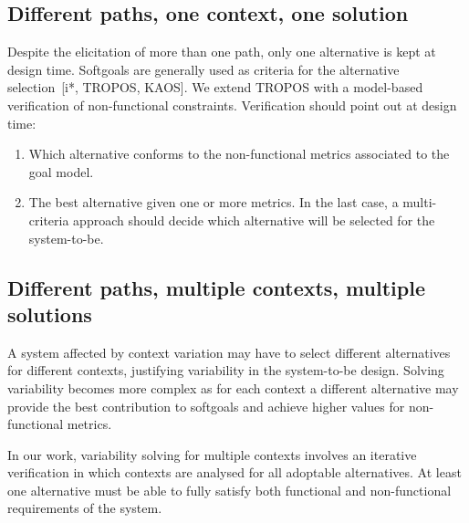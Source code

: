 
\subsection{Different paths, one context, one solution}

Despite the elicitation of more than one path, only one alternative is kept at design time. Softgoals are generally used as criteria for the alternative selection~[i*, TROPOS, KAOS]. We extend TROPOS with a model-based verification of  non-functional constraints. Verification should point out at design time:

\begin{enumerate}

\item Which alternative conforms to the non-functional metrics associated to the goal model. 
\medskip

\item The best alternative given one or more metrics. In the last case, a multi-criteria approach should decide which alternative will be selected for the system-to-be.

\end{enumerate}

\subsection{Different paths, multiple contexts, multiple  solutions}

A system affected by context variation may have to select different alternatives for different contexts, justifying variability in the system-to-be design. Solving variability becomes more complex as for each context a different alternative may provide the best contribution to softgoals and achieve higher values for non-functional metrics. 

In our work, variability solving for multiple contexts involves an iterative verification in which contexts are analysed for all adoptable alternatives. At least one alternative must be able to fully satisfy both functional and non-functional requirements of the system.

